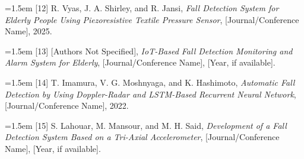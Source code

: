 \hangindent=1.5em [12] R. Vyas, J. A. Shirley, and R. Jansi, \textit{Fall Detection System for Elderly People Using Piezoresistive Textile Pressure Sensor}, [Journal/Conference Name], 2025.

\hangindent=1.5em [13] [Authors Not Specified], \textit{IoT-Based Fall Detection Monitoring and Alarm System for Elderly}, [Journal/Conference Name], [Year, if available].

\hangindent=1.5em [14] T. Imamura, V. G. Moshnyaga, and K. Hashimoto, \textit{Automatic Fall Detection by Using Doppler-Radar and LSTM-Based Recurrent Neural Network}, [Journal/Conference Name], 2022.

\hangindent=1.5em [15] S. Lahouar, M. Mansour, and M. H. Said, \textit{Development of a Fall Detection System Based on a Tri-Axial Accelerometer}, [Journal/Conference Name], [Year, if available].
